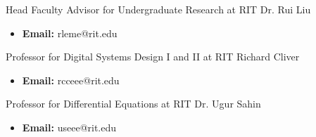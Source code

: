 

\begin{cventries}

\vspace{\acvSectionContentTopSkip}
\cventrySpec
{Head Faculty Advisor for Undergraduate Research at RIT} %
{Dr. Rui Liu} %
{} %
{} %
\begin{cvvols}
	{\paragraphstyle \justify
		\begin{itemize}[leftmargin=2ex, nosep, noitemsep]
			\item \textbf{Email: } rleme@rit.edu
		\end{itemize}
	}
\end{cvvols}

\vspace{\acvSectionContentTopSkip}
\vspace{\acvSectionContentTopSkip}

\cventrySpec
{Professor for Digital Systems Design I and II at RIT} %
{Richard Cliver} %
{} %
{} %
\begin{cvvols}
	{\paragraphstyle \justify
		\begin{itemize}[leftmargin=2ex, nosep, noitemsep]
			\item \textbf{Email: } rcceee@rit.edu
		\end{itemize}
	}
\end{cvvols}

\vspace{\acvSectionContentTopSkip}
\vspace{\acvSectionContentTopSkip}

\cventrySpec
{Professor for Differential Equations at RIT} %
{Dr. Ugur Sahin} %
{} %
{} %
{\begin{cvvols}
		{\paragraphstyle \justify
			\begin{itemize}[leftmargin=2ex, nosep, noitemsep]
				\item \textbf{Email: } useee@rit.edu
			\end{itemize}
		}
\end{cvvols}}


\end{cventries}